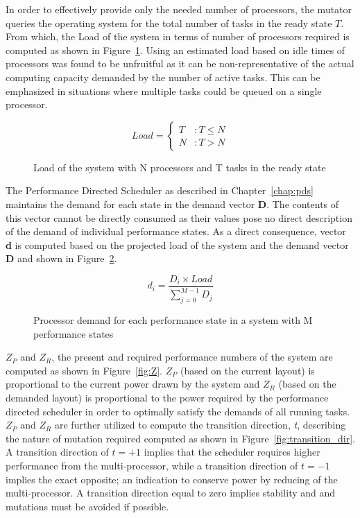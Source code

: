 In order to effectively provide only the needed number of processors, the mutator
queries the operating system for the total number of tasks in the ready state $T$. 
From which, the Load of the system in terms of number of processors required is computed 
as shown in Figure~\ref{fig:projected_load}. Using an estimated load based on idle times
of processors was found to be unfruitful as it can be non-representative of the actual 
computing capacity demanded by the number of active tasks. This can be emphasized in situations where multiple
tasks could be queued on a single processor.

\begin{figure}[h!]
\centering
\begin{equation*}
    Load = \left\{
     \begin{array}{lr}
       T & : T \leq N\\
       N & : T > N
     \end{array}
   \right.
\end{equation*}
\caption{Load of the system with N processors and T tasks in the ready state}
\label{fig:projected_load}
\end{figure}

The Performance Directed Scheduler as described in Chapter~\ref{chap:pds} maintains
the demand for each state in the demand vector \textbf{D}. The contents of this vector
cannot be directly consumed as their values pose no direct description of the demand 
of individual performance states. As a direct consequence, vector \textbf{d} is computed based 
on the projected load of the system and the demand vector \textbf{D} and shown in
Figure~\ref{fig:processor_demand}.

\begin{figure}[h!]
\centering
\begin{equation*}
    d_{i} = \frac{D_{i} \times Load}{\displaystyle\sum_{j=0}^{M-1} {D_{j}}}
\end{equation*}
\caption{Processor demand for each performance state in a system with M performance states}
\label{fig:processor_demand}
\end{figure}

$Z_{P}$ and $Z_{R}$, the present and required performance numbers of the system 
are computed as shown in Figure~\ref{fig:Z}. $Z_{P}$ (based on the current layout) is proportional to the current power drawn by
the system and $Z_{R}$ (based on the demanded layout) is proportional to the power required by the performance directed
scheduler in order to optimally satisfy the demands of all running tasks. $Z_{P}$ and $Z_{R}$ 
are further utilized to compute the transition direction, \textit{t}, describing the nature of 
mutation required computed as shown in Figure~\ref{fig:transition_dir}. 
A transition direction of $t = +1$ implies that the scheduler requires higher performance from
the multi-processor, while a transition direction of $t = -1$ implies the exact opposite; an indication
to conserve power by reducing of the multi-processor. A transition direction equal to zero
implies stability and and mutations must be avoided if possible.

